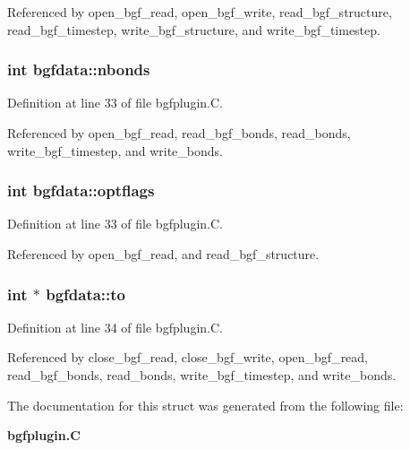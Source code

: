 Referenced by open\_\-bgf\_\-read, open\_\-bgf\_\-write, read\_\-bgf\_\-structure, read\_\-bgf\_\-timestep, write\_\-bgf\_\-structure, and write\_\-bgf\_\-timestep.
\subsubsection{\setlength{\rightskip}{0pt plus 5cm}int bgfdata::nbonds}\label{structbgfdata_m3}




Definition at line 33 of file bgfplugin.C.

Referenced by open\_\-bgf\_\-read, read\_\-bgf\_\-bonds, read\_\-bonds, write\_\-bgf\_\-timestep, and write\_\-bonds.
\subsubsection{\setlength{\rightskip}{0pt plus 5cm}int bgfdata::optflags}\label{structbgfdata_m4}




Definition at line 33 of file bgfplugin.C.

Referenced by open\_\-bgf\_\-read, and read\_\-bgf\_\-structure.
\subsubsection{\setlength{\rightskip}{0pt plus 5cm}int $\ast$ bgfdata::to}\label{structbgfdata_m7}




Definition at line 34 of file bgfplugin.C.

Referenced by close\_\-bgf\_\-read, close\_\-bgf\_\-write, open\_\-bgf\_\-read, read\_\-bgf\_\-bonds, read\_\-bonds, write\_\-bgf\_\-timestep, and write\_\-bonds.

The documentation for this struct was generated from the following file:\begin{CompactItemize}
\item 
{\bf bgfplugin.C}\end{CompactItemize}

